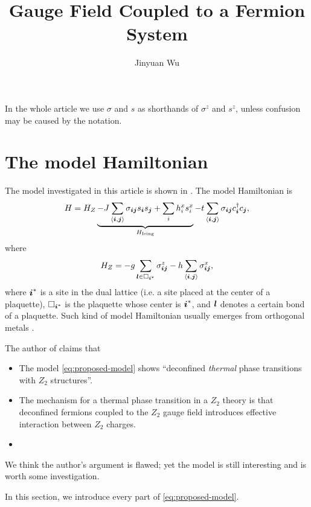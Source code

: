 \documentclass[hyperref, a4paper]{article}
\title{\Ztwo Gauge Field Coupled to a Fermion System}
\author{Jinyuan Wu}
\newcommand*{\pair}[1]{\langle #1 \rangle}
\newcommand*{\Ztwo}{$\mathbb{Z}_2$ }
\def\mathbb#1{#1}%
\begin{document}
\maketitle

In the whole article we use $\sigma$ and $s$ as shorthands of $\sigma^z$ and $s^z$, unless confusion may be caused by the notation.

\section{The model Hamiltonian}

The model investigated in this article is shown in \cite{moon2019deconfined}.
The model Hamiltonian is 
\begin{equation}
    H = H_Z \underbrace{- J \sum_{\pair{\vb*{i}, \vb*{j}}} \sigma_{\vb*{i} \vb*{j}} s_{\vb*{i}} s_{\vb*{j}} + \sum_i h^x_i s^x_i}_{H_\text{Ising}} - t \sum_{\pair{\vb*{i}, \vb*{j}}} \sigma_{\vb*{i} \vb*{j}} c^\dagger_{\vb*{i}} c_{\vb*{j}},
    \label{eq:proposed-model}
\end{equation}
where
\begin{equation}
    H_Z = - g \sum_{\vb*{l} \in \Box_{\vb*{i}^*}} \sigma_{\vb*{i} \vb*{j}}^z - h \sum_{\pair{\vb*{i}, \vb*{j}}} \sigma^x_{\vb*{i} \vb*{j}}, 
\end{equation}
where $\vb*{i}^*$ is a site in the dual lattice (i.e. a site placed at the center of a plaquette), 
$\Box_{\vb*{i}^*}$ is the plaquette whose center is $\vb*{i}^*$, and $\vb*{l}$ denotes a certain bond of a plaquette.
Such kind of model Hamiltonian usually emerges from orthogonal metals \cite{moon2019deconfined, orthogonal_metal}.

The author of \cite{moon2019deconfined} claims that 
\begin{itemize}
    \item The model \eqref{eq:proposed-model} shows ``deconfined \emph{thermal} phase transitions with \Ztwo structures''. 
    \item The mechanism for a thermal phase transition in a \Ztwo theory is that deconfined fermions coupled to the \Ztwo gauge field introduces effective interaction between \Ztwo charges.
    \item %
\end{itemize}
We think the author's argument is flawed; yet the model is still interesting and is worth some investigation.

In this section, we introduce every part of \eqref{eq:proposed-model}.
\end{document}
